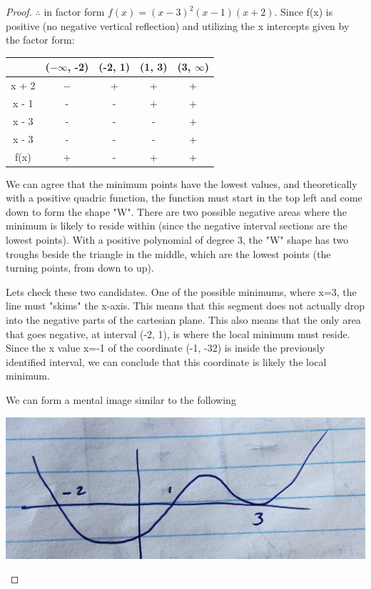 \documentclass[12pt]{book}
\begin{document}
\begin{enumerate}
\begin{proof}
\newpage

$\therefore$ in factor form $f(x) = {(x-3)}^2(x-1)(x+2)$. Since f(x) is positive 
(no negative vertical reflection) and utilizing the x intercepts given by the factor form:

\begin{center}
    \begin{tabular}{|c|c|c|c|c|}
        \hline
        & ($-\infty$, -2) & (-2, 1) & (1, 3) & (3, $\infty$) \\ \hline
        x + 2 & $-$ & + & + & + \\ \hline
        x - 1 & - & - & + & + \\ \hline
        x - 3 & - & - & - & + \\ \hline
        x - 3 & - & - & - & + \\ \hline
        f(x) & + & - & + & + \\ \hline
    \end{tabular}
\end{center}

\vspace{0.5cm}
We can agree that the minimum points have the lowest values, and theoretically 
with a positive quadric function, the function must start in the top left and come down to form the shape "W".  
There are two possible negative areas where the minimum is likely to reside within 
(since the negative interval sections are the lowest points). 
With a positive polynomial of degree 3, the "W" shape has two troughs beside 
the triangle in the middle, which are the lowest points (the turning points, from down to up).

\vspace{0.5cm}
Lets check these two candidates. One of the possible minimums, where x=3, the line must "skims"
the x-axis. This means that this segment does not actually drop into the negative parts 
of the cartesian plane. This also means that the only area that goes negative, at interval (-2, 1),
is where the local minimum must reside. Since the x value x=-1 of the coordinate (-1, -32) is inside
the previously identified interval, we can conclude that this coordinate is likely the local minimum.

\vspace{0.8cm}
\begin{center}
    We can form a mental image similar to the following

    \includegraphics[scale=0.05]{A2-2 Diagram.jpeg}
\end{center}


\end{proof}
\end{enumerate}
\end{document}
